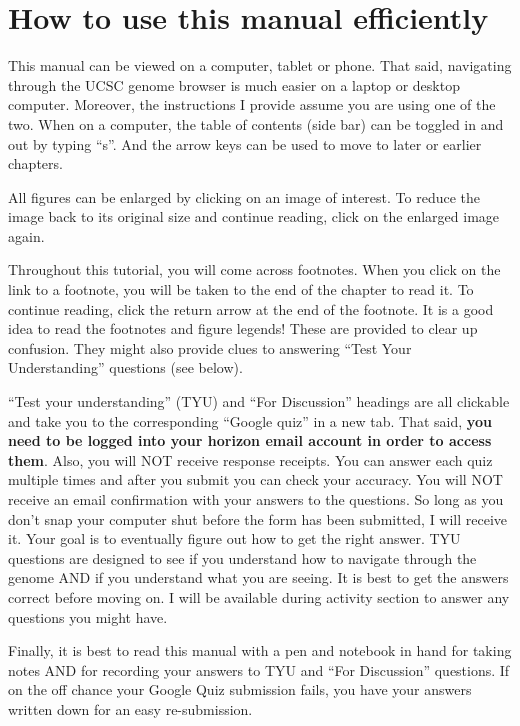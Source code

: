 \documentclass[
]{book}
\begin{document}
\hypertarget{how-to-use-this-manual-efficiently}{%
\section*{How to use this manual efficiently}\label{how-to-use-this-manual-efficiently}}

This manual can be viewed on a computer, tablet or phone. That said, navigating through the UCSC genome browser is much easier on a laptop or desktop computer. Moreover, the instructions I provide assume you are using one of the two. When on a computer, the table of contents (side bar) can be toggled in and out by typing ``s''. And the arrow keys can be used to move to later or earlier chapters.

All figures can be enlarged by clicking on an image of interest. To reduce the image back to its original size and continue reading, click on the enlarged image again.

Throughout this tutorial, you will come across footnotes. When you click on the link to a footnote, you will be taken to the end of the chapter to read it. To continue reading, click the return arrow at the end of the footnote. It is a good idea to read the footnotes and figure legends! These are provided to clear up confusion. They might also provide clues to answering ``Test Your Understanding'' questions (see below).

``Test your understanding'' (TYU) and ``For Discussion'' headings are all clickable and take you to the corresponding ``Google quiz'' in a new tab. That said, \textbf{you need to be logged into your horizon email account in order to access them}. Also, you will NOT receive response receipts. You can answer each quiz multiple times and after you submit you can check your accuracy. You will NOT receive an email confirmation with your answers to the questions. So long as you don't snap your computer shut before the form has been submitted, I will receive it. Your goal is to eventually figure out how to get the right answer. TYU questions are designed to see if you understand how to navigate through the genome AND if you understand what you are seeing. It is best to get the answers correct before moving on. I will be available during activity section to answer any questions you might have.

Finally, it is best to read this manual with a pen and notebook in hand for taking notes AND for recording your answers to TYU and ``For Discussion'' questions. If on the off chance your Google Quiz submission fails, you have your answers written down for an easy re-submission.
\end{document}
